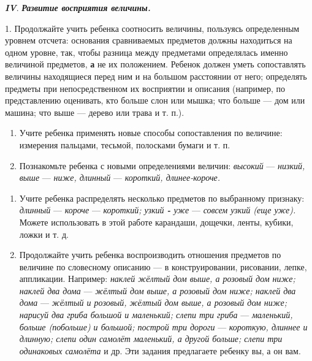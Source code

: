 \documentclass[a5paper]{book}
\renewcommand{\emph}[1]{\textit{#1}}
\begin{document}
\emph{\textbf{IV}}. \emph{\textbf{Развитие восприятия величины.}}

1. Продолжайте учить ребенка соотносить величины, пользуясь определенным
уровнем отсчета: основания сравниваемых предметов должны находиться на
одном уровне, так, чтобы разница между предметами определялась именно
величиной предметов, \textbf{а} не их положением. Ребенок должен уметь
сопоставлять величины находящиеся перед ним и на большом расстоянии от
него; определять предметы при непосредственном их восприятии и описания
(например, по представлению оценивать, кто больше слон или мышка; что
больше --- дом или машина; что выше --- дерево или трава и т. п.).


\begin{enumerate}
\def\labelenumi{\arabic{enumi}.}
\setcounter{enumi}{1}
\item
  
  Учите ребенка применять новые способы сопоставления по величине:
  измерения пальцами, тесьмой, полосками бумаги и т. п.
  
\item
  
  Познакомьте ребенка с новыми определениями величин: \emph{высокий} ---
  \emph{низкий, выше} --- \emph{ниже, длинный} --- \emph{короткий,
  длинее-короче.}
  
\end{enumerate}

\begin{enumerate}
\def\labelenumi{\arabic{enumi}.}
\setcounter{enumi}{3}
\item
  
  Учите ребенка распределять несколько предметов по выбранному признаку:
  \emph{длинный} --- \emph{короче} --- \emph{короткий; узкий \textbf{-}
  уже} --- \emph{совсем узкий (еще уже).} Можете использовать в этой
  работе карандаши, дощечки, ленты, кубики, ложки и т. д.
  
\item
  
  Продолжайте учить ребенка воспроизводить отношения предметов по
  величине по словесному описанию --- в конструировании, рисовании,
  лепке, аппликации. Например: \emph{наклей жёлтый дом выше, а розовый
  дом ниже; наклей два дома} --- \emph{жёлтый дом выше, а розовый дом
  ниже; наклей два дома} --- \emph{жёлтый и розовый, жёлтый дом выше, а
  розовый дом ниже; нарисуй два гриба большой и маленький; слепи три
  гриба} --- \emph{маленький, больше (побольше) и большой; построй три
  дороги} --- \emph{короткую, длиннее и длинную; слепи один самолёт
  маленький, а другой больше; слепи три одинаковых самолёта} и др. Эти
  задания предлагаете ребенку вы, а он вам.
  
\end{enumerate}
\end{document}
